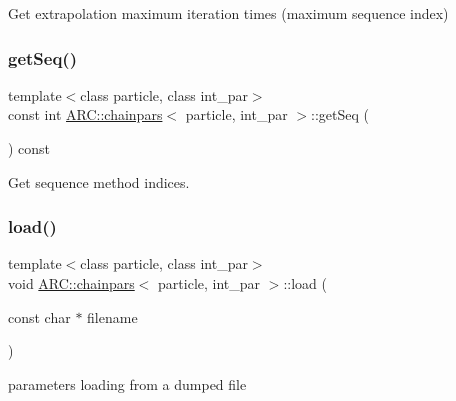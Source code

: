 Get extrapolation maximum iteration times (maximum sequence index) 

\hypertarget{classARC_1_1chainpars_a3dda52dfc721423b218c86022c3aca90}{}\label{classARC_1_1chainpars_a3dda52dfc721423b218c86022c3aca90} 
\subsubsection{\texorpdfstring{get\+Seq()}{getSeq()}}
{\footnotesize\ttfamily template$<$class particle, class int\+\_\+par$>$ \\
const int \hyperlink{classARC_1_1chainpars}{A\+R\+C\+::chainpars}$<$ particle, int\+\_\+par $>$\+::get\+Seq (\begin{DoxyParamCaption}{ }\end{DoxyParamCaption}) const\hspace{0.3cm}{\ttfamily [inline]}}



Get sequence method indices. 

\hypertarget{classARC_1_1chainpars_a881b1143fd8935bbfb454a769c485f63}{}\label{classARC_1_1chainpars_a881b1143fd8935bbfb454a769c485f63} 
\subsubsection{\texorpdfstring{load()}{load()}}
{\footnotesize\ttfamily template$<$class particle, class int\+\_\+par$>$ \\
void \hyperlink{classARC_1_1chainpars}{A\+R\+C\+::chainpars}$<$ particle, int\+\_\+par $>$\+::load (\begin{DoxyParamCaption}\item[{const char $\ast$}]{filename }\end{DoxyParamCaption})\hspace{0.3cm}{\ttfamily [inline]}}



parameters loading from a dumped file 


